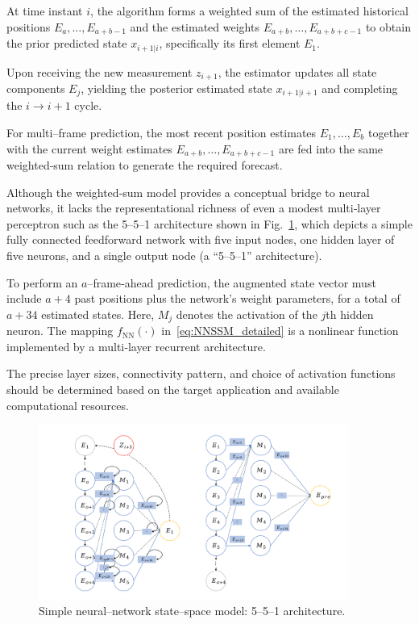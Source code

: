 \documentclass[sn-nature]{sn-jnl}%
\theoremstyle{thmstyleone}%
\theoremstyle{thmstyletwo}%
\theoremstyle{thmstylethree}%
\begin{document}
At time instant \(i\), the algorithm forms a weighted sum of the estimated historical positions  
\(E_{a},\dots,E_{a+b-1}\)  and the estimated weights  
\(E_{a+b},\dots,E_{a+b+c-1}\)  
to obtain the prior predicted state \(x_{i+1|i}\), specifically its first element \(E_1\). 

Upon receiving the new measurement \(z_{i+1}\), the estimator updates all state components \(E_j\), yielding the posterior estimated state \(x_{i+1|i+1}\) and completing the \(i\!\rightarrow\!i+1\) cycle.

For multi–frame prediction, the most recent position estimates \(E_{1},\dots,E_{b}\) together with the current weight estimates \(E_{a+b},\dots,E_{a+b+c-1}\) are fed into the same weighted‐sum relation to generate the required forecast.

Although the weighted‐sum model provides a conceptual bridge to neural networks, it lacks the representational richness of even a modest multi‐layer perceptron such as the 5–5–1 architecture shown in Fig.~\ref{fig:NNSSM2}, which depicts a simple fully connected feedforward network with five input nodes, one hidden layer of five neurons, and a single output node (a “5–5–1” architecture).  

To perform an \(a\)–frame‐ahead prediction, the augmented state vector must include \(a+4\) past positions plus the network’s weight parameters, for a total of \(a+34\) estimated states.  Here, \(M_j\) denotes the activation of the \(j\)th hidden neuron.  The mapping \(f_{\mathrm{NN}}(\cdot)\) in~\eqref{eq:NNSSM_detailed} is a nonlinear function implemented by a multi‐layer recurrent architecture.

The precise layer sizes, connectivity pattern, and choice of activation functions should be determined based on the target application and available computational resources.

\begin{figure}[!t]
  \centering
  \includegraphics[width=4in]{fig/fig3_3.png}
  \caption{Simple neural–network state–space model: 5–5–1 architecture.}
  \label{fig:NNSSM2}
\end{figure}
\end{document}
